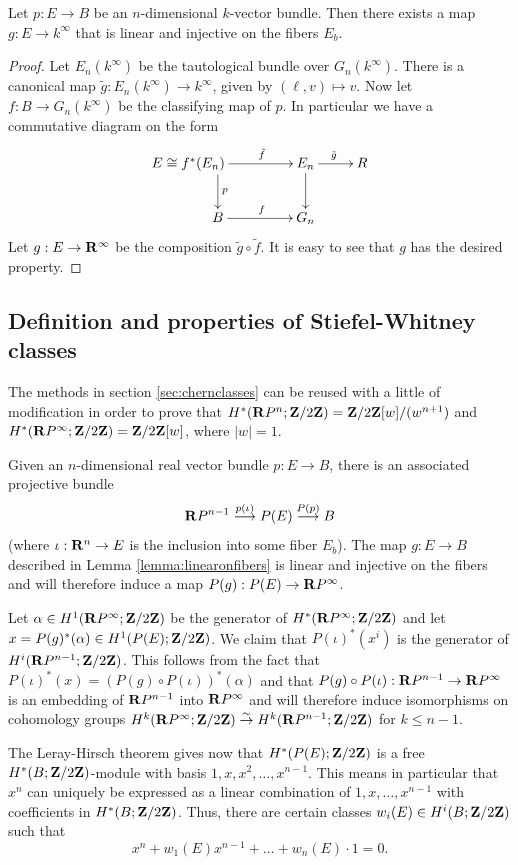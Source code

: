 \documentclass[a4paper,openany]{scrbook}
\begin{document}
\begin{lemma}\label{lemma:linearonfibers}
Let $p:E\to B$ be an $n$-dimensional $k$-vector bundle. Then there exists a map $g: E\to k^\infty$ that is linear and injective on the fibers $E_b$. 
\end{lemma}
\begin{proof}
Let $E_n(k^\infty)$ be the tautological bundle over $G_n(k^\infty)$. There is a canonical map $\tilde g: E_n(k^\infty)\to k^\infty$, given by $(\ell,v)\mapsto v$. Now let $f:B\to G_n(k^\infty)$ be the classifying map of $p$. In particular we have  a commutative diagram on the form
$$\xymatrix{*+[l]{E\cong f^*(E_n)}\ar[r]^{\tilde f}\ar[d]^p & E_n\ar[d]\ar[r]^{\tilde g} & R\\
 B\ar[r]^f & G_n
}$$
Let $g: E\to \mathbf R^\infty$ be the composition $\tilde g\circ\tilde f$. It is easy to see that $g$ has the desired property.
\end{proof}

\subsection{Definition and properties of Stiefel-Whitney classes}\label{subsec:dfnSWclasses}
The methods  in section \ref{sec:chernclasses} can be reused with a little of modification in order to prove that $H^*(\mathbf R P^n;\mathbf Z/2\mathbf Z)= \mathbf Z/2\mathbf Z[w]/(w^{n+1})$ and $H^*(\mathbf R P^\infty;\mathbf Z/2\mathbf Z)= \mathbf Z/2\mathbf Z[w]$, where $|w|=1$. 

Given an $n$-dimensional real vector bundle $p: E\to B$, there is an associated projective bundle
$$\mathbf R P^{n-1}\overset{p(\iota)}\longrightarrow P(E)\overset{P(p)}\longrightarrow B$$
(where $\iota:\mathbf R^n\to E$ is the inclusion into some fiber $E_b$). The map $g: E\to B$ described in Lemma \ref{lemma:linearonfibers} is linear and injective on the fibers and will therefore induce a map $P(g):P(E)\to\mathbf R P^\infty$.

Let $\alpha\in H^1(\mathbf R P^\infty;\mathbf Z/2\mathbf Z)$ be the generator of $H^*(\mathbf R P^\infty;\mathbf Z/2\mathbf Z)$ and let $x=P(g)^*(\alpha)\in H^1(P(E);\mathbf Z/2\mathbf Z)$.
We claim  that $P(\iota)^*(x^i)$ is the generator of $H^i(\mathbf R P^{n-1};\mathbf Z/2\mathbf Z)$. This follows from the fact that $P(\iota)^*(x)= (P(g)\circ P(\iota))^*(\alpha)$ and that $P(g)\circ P(\iota):\mathbf R P^{n-1}\to \mathbf R P^\infty$ is an embedding of $\mathbf R P^{n-1}$ into $\mathbf R P^\infty$ and will therefore induce isomorphisms on cohomology groups $H^k(\mathbf R P^\infty;\mathbf Z/2\mathbf Z)\overset\sim\to H^k(\mathbf R P^{n-1};\mathbf Z/2\mathbf Z)$ for $k\leq n-1$.

The Leray-Hirsch theorem gives now that $H^*(P(E);\mathbf Z/2\mathbf Z)$ is a free $H^*(B;\mathbf Z/2\mathbf Z)$-module with basis $1,x,x^2,\dots,x^{n-1}$. This means in particular that $x^n$ can uniquely be expressed as a linear combination of $1,x,\dots,x^{n-1}$ with coefficients in $H^*(B;\mathbf Z/2\mathbf Z)$. Thus, there are certain classes $w_i(E)\in H^i(B;\mathbf Z/2\mathbf Z)$ such that
$$x^n+w_1(E)x^{n-1}+\dots+w_n(E)\cdot1=0.$$
\end{document}
